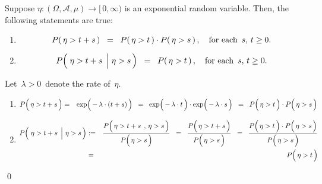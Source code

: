 \vskip 0.5cm
\begin{proposition}
\mbox{}
\vskip 0.1cm
\noindent
Suppose $\eta : (\Omega,\mathcal{A},\mu) \longrightarrow [\,0,\infty)$
is an exponential random variable.
Then, the following statements are true:
\begin{enumerate}
\item
	\begin{equation*}
	P\!\left(\,\eta > t + s\,\right) \;\; = \;\; P\!\left(\,\eta > t \,\right) \cdot P\!\left(\,\eta > s\,\right),
	\quad
	\textnormal{for each \,$s,\, t \geq 0$}.
	\end{equation*}
\item
	\begin{equation*}
	P\!\left(\,\left.\eta \overset{{\color{white}.}}{>} t + s \;\,\right\vert\,\eta > s\,\right)
	\;\; = \;\;
		P\!\left(\,\eta > t \,\right),
	\quad
	\textnormal{for each \,$s,\, t \geq 0$}.
	\end{equation*}
\end{enumerate}
\end{proposition}
\proof
Let \,$\lambda > 0$\, denote the rate of \,$\eta$.
\begin{enumerate}
\item
	\begin{eqnarray*}
	P\!\left(\,\eta \overset{{\color{white}.}}{>} t + s \,\right)
	& = &
		\exp\!\left(\,\overset{{\color{white}.}}{-}\,\lambda\cdot(t+s)\,\right)
	\;\; = \;\;
		\exp\!\left(\,\overset{{\color{white}.}}{-}\,\lambda \cdot t\,\right)
		\cdot
		\exp\!\left(\,\overset{{\color{white}.}}{-}\,\lambda \cdot s\,\right)
	\;\; = \;\;
		P\!\left(\,\eta \overset{{\color{white}.}}{>} t \,\right)
		\cdot
		P\!\left(\,\eta \overset{{\color{white}.}}{>} s \,\right)
	\end{eqnarray*}
\item
	\begin{eqnarray*}
	P\!\left(\,\left.\eta \overset{{\color{white}.}}{>} t + s \;\,\right\vert\,\eta > s\,\right)
	& := &
		\dfrac{
			P\!\left(\, \eta \overset{{\color{white}.}}{>} t + s \;\,,\,\eta > s\,\right)
			}{
			P\!\left(\, \eta \overset{{\color{white}.}}{>} s \,\right)
			}
	\;\; = \;\;
		\dfrac{
			P\!\left(\, \eta \overset{{\color{white}.}}{>} t + s \,\right)
			}{
			P\!\left(\, \eta \overset{{\color{white}.}}{>} s \,\right)
			}
	\;\; = \;\;
		\dfrac{
			P\!\left(\,\eta \overset{{\color{white}.}}{>} t \,\right)
			\cdot
			P\!\left(\,\eta \overset{{\color{white}.}}{>} s \,\right)
			}{
			P\!\left(\, \eta \overset{{\color{white}.}}{>} s \,\right)
			}
	\\
	& = &
		P\!\left(\,\eta \overset{{\color{white}.}}{>} t \,\right)
	\end{eqnarray*}
\end{enumerate}
\qed

